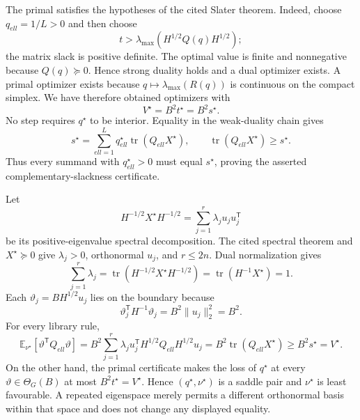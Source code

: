 The primal satisfies the hypotheses of the cited Slater theorem.  Indeed, choose \(q_{ell}=1/L>0\) and then choose
\[
 t>\lambda_{\max}\!\left(H^{1/2}Q(q)H^{1/2}\right);
\]
the matrix slack is positive definite.  The optimal value is finite and nonnegative because \(Q(q)\succeq0\).  Hence strong duality holds and a dual optimizer exists.  A primal optimizer exists because \(q\mapsto\lambda_{\max}(R(q))\) is continuous on the compact simplex.  We have therefore obtained optimizers with
\[
 V^{\star}=B^2t^{\star}=B^2s^{\star}.
\]
No step requires \(q^{\star}\) to be interior.  Equality in the weak-duality chain gives
\[
 s^{\star}
 =\sum_{ell=1}^Lq_{ell}^{\star}\operatorname{tr}(Q_{ell}X^{\star}),
 \qquad
 \operatorname{tr}(Q_{ell}X^{\star})\ge s^{\star}.
\]
Thus every summand with \(q_{ell}^{\star}>0\) must equal \(s^{\star}\), proving the asserted complementary-slackness certificate.

Let
\[
 H^{-1/2}X^{\star}H^{-1/2}
 =\sum_{j=1}^{r}\lambda_ju_ju_j^{\mathsf T}
\]
be its positive-eigenvalue spectral decomposition.  The cited spectral theorem and \(X^{\star}\succeq0\) give \(\lambda_j>0\), orthonormal \(u_j\), and \(r\le2n\).  Dual normalization gives
\[
 \sum_{j=1}^r\lambda_j
 =\operatorname{tr}(H^{-1/2}X^{\star}H^{-1/2})
 =\operatorname{tr}(H^{-1}X^{\star})=1.
\]
Each \(\vartheta_j=BH^{1/2}u_j\) lies on the boundary because
\[
 \vartheta_j^{\mathsf T}H^{-1}\vartheta_j=B^2\|u_j\|_2^2=B^2.
\]
For every library rule,
\[
 \mathbb E_{\nu^{\star}}[\vartheta^{\mathsf T}Q_{ell}\vartheta]
 =B^2\sum_{j=1}^r\lambda_ju_j^{\mathsf T}H^{1/2}Q_{ell}H^{1/2}u_j
 =B^2\operatorname{tr}(Q_{ell}X^{\star})
 \ge B^2s^{\star}=V^{\star}.
\]
On the other hand, the primal certificate makes the loss of \(q^{\star}\) at every \(\vartheta\in\Theta_G(B)\) at most \(B^2t^{\star}=V^{\star}\).  Hence \((q^{\star},\nu^{\star})\) is a saddle pair and \(\nu^{\star}\) is least favourable.  A repeated eigenspace merely permits a different orthonormal basis within that space and does not change any displayed equality.

